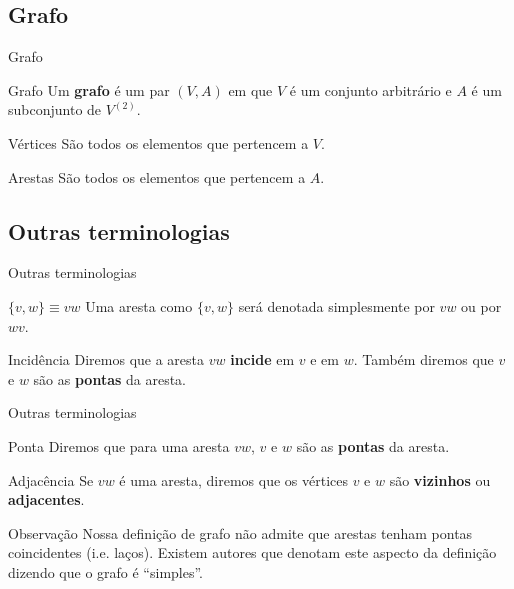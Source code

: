 \documentclass[xcolor=dvipsnames,table]{beamer}
\begin{document}
	
	\subsection{Grafo}
	\begin{frame}{Grafo}
		\begin{block}{Grafo}
			Um {\bf grafo} é um par $(V,A)$ em que $V$ é um conjunto arbitrário e $A$ é um subconjunto de $V^{(2)}$.
		\end{block}
		\pause
		\begin{block}{Vértices}
			São todos os elementos que pertencem a $V$.
		\end{block}
		\pause
		\begin{block}{Arestas}
			São todos os elementos que pertencem a $A$.
		\end{block}
	\end{frame}
	
	\subsection{Outras terminologias}
	\begin{frame}{Outras terminologias}
		\begin{block}{$\{v,w\} \equiv vw$}
			Uma aresta como $\{v,w\}$ será denotada simplesmente por $vw$ ou por $wv$.
		\end{block}
		\pause
		\begin{block}{Incidência}
			Diremos que a aresta $vw$ {\bf incide} em $v$ e em $w$. Também diremos que $v$ e $w$ são as {\bf pontas} da aresta.
		\end{block}
	\end{frame}
	
	\begin{frame}{Outras terminologias}
		\begin{block}{Ponta}
			Diremos que para uma aresta $vw$, $v$ e $w$ são as {\bf pontas} da aresta.
		\end{block}
		\pause
		\begin{block}{Adjacência}
			Se $vw$ é uma aresta, diremos que os vértices $v$ e $w$ são {\bf vizinhos} ou {\bf adjacentes}.
		\end{block}
		\pause
		\begin{block}{Observação}
			Nossa definição de grafo não admite que arestas tenham pontas coincidentes (i.e. laços). Existem autores que denotam este aspecto da definição dizendo que o grafo é ``simples''.
		\end{block}
	\end{frame}
	
\end{document}
